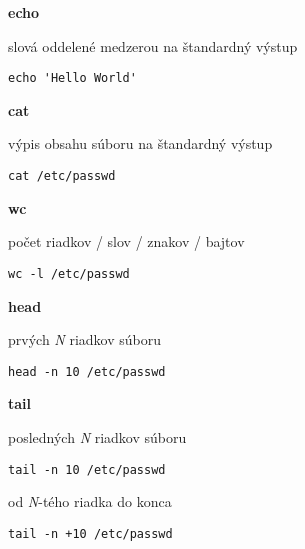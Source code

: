 \documentclass[8pt,landscape]{extarticle}
\newcommand{\Heading}[1]{%
{\begin{center}\bfseries\Large#1\end{center}}%
}%
\newenvironment{karticka}[1]%
{%
\Heading{#1}%
}%
{%
\clearpage
}%
\begin{document}
\begin{karticka}{echo}
\begin{obsah}
slová oddelené medzerou na štandardný výstup
\end{obsah}
\begin{tcolorbox}
\begin{Verbatim}
echo 'Hello World'
\end{Verbatim}
\end{tcolorbox}
\end{karticka}
\begin{karticka}{cat}
\begin{obsah}
výpis obsahu súboru na štandardný výstup
\end{obsah}
\begin{middlecolorbox}
\begin{Verbatim}
cat /etc/passwd
\end{Verbatim}
\end{middlecolorbox}
\end{karticka}
\begin{karticka}{wc}
\begin{obsah}
počet riadkov / slov / znakov / bajtov
\end{obsah}
\begin{middlecolorbox}
\begin{Verbatim}
wc -l /etc/passwd
\end{Verbatim}
\end{middlecolorbox}
\end{karticka}
\begin{karticka}{head}
\begin{obsah}
prvých \emph{N} riadkov súboru
\end{obsah}
\begin{middlecolorbox}
\begin{Verbatim}
head -n 10 /etc/passwd
\end{Verbatim}
\end{middlecolorbox}
\end{karticka}
\begin{karticka}{tail}
\begin{obsah}
posledných \emph{N} riadkov súboru
\end{obsah}
\begin{middlecolorbox}
\begin{Verbatim}
tail -n 10 /etc/passwd
\end{Verbatim}
\end{middlecolorbox}
\begin{obsah}
od \emph{N}-tého riadka do konca
\end{obsah}
\begin{middlecolorbox}
\begin{Verbatim}
tail -n +10 /etc/passwd
\end{Verbatim}
\end{middlecolorbox}

\end{karticka}
\end{document}
